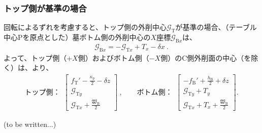\subsubsection{トップ側が基準の場合}
回転によるずれを考慮すると、トップ側の外削中心$\mathcal G_\mathrm T$が基準の場合、（テーブル中心Pを原点とした）墓ボトム側の外削中心の$X$座標$\mathcal G_{\mathrm Bx}$は、
\begin{align*}
  \mathcal G_{\mathrm Bx} = -\mathcal G_{\mathrm Tx}+T_x-\delta x\ .
\end{align*}
よって、トップ側（$+X$側）およびボトム側（$-X$側）のC側外削面の中心（\Keyway を除く）は、より、
\begin{align*}
  \text{トップ側：}~~
  \left[
    \begin{array}{c}
      \displaystyle f_\mathrm T'-\frac{\kappa_p}2-\delta z\\[5pt]
      \mathcal G_{\mathrm Ty}\\[3pt]
      \displaystyle \mathcal G_{\mathrm Tx}+\frac{\mathfrak W_\mathrm B}2
    \end{array}
    \right]~, \qquad
  \text{ボトム側：}~~
  \left[
    \begin{array}{c}
      \displaystyle -f_\mathrm B'+\frac{h_\mathrm B}2+\delta z\\[5pt]
      \mathcal G_{\mathrm Ty}+T_y\\[3pt]
      \displaystyle \mathcal G_{\mathrm Tx}+T_x+\frac{\mathfrak W_\mathrm B}2
    \end{array}
  \right].
\end{align*}



\clearpage
(to be written...)
